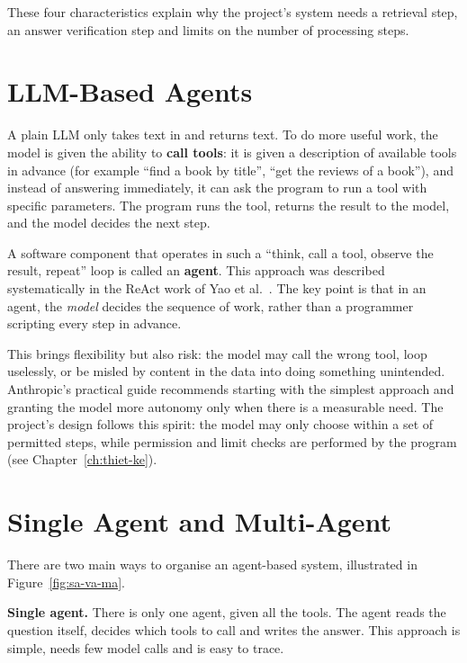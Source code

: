 These four characteristics explain why the project's system needs a retrieval step, an answer verification step and limits on the number of processing steps.

\section{LLM-Based Agents}

A plain LLM only takes text in and returns text. To do more useful work, the model is given the ability to \textbf{call tools}: it is given a description of available tools in advance (for example ``find a book by title'', ``get the reviews of a book''), and instead of answering immediately, it can ask the program to run a tool with specific parameters. The program runs the tool, returns the result to the model, and the model decides the next step.

A software component that operates in such a ``think, call a tool, observe the result, repeat'' loop is called an \textbf{agent}. This approach was described systematically in the ReAct work of Yao et al.\ . The key point is that in an agent, the \emph{model} decides the sequence of work, rather than a programmer scripting every step in advance.

This brings flexibility but also risk: the model may call the wrong tool, loop uselessly, or be misled by content in the data into doing something unintended. Anthropic's practical guide  recommends starting with the simplest approach and granting the model more autonomy only when there is a measurable need. The project's design follows this spirit: the model may only choose within a set of permitted steps, while permission and limit checks are performed by the program (see Chapter~\ref{ch:thiet-ke}).

\section{Single Agent and Multi-Agent}

There are two main ways to organise an agent-based system, illustrated in Figure~\ref{fig:sa-va-ma}.


\textbf{Single agent.} There is only one agent, given all the tools. The agent reads the question itself, decides which tools to call and writes the answer. This approach is simple, needs few model calls and is easy to trace.

